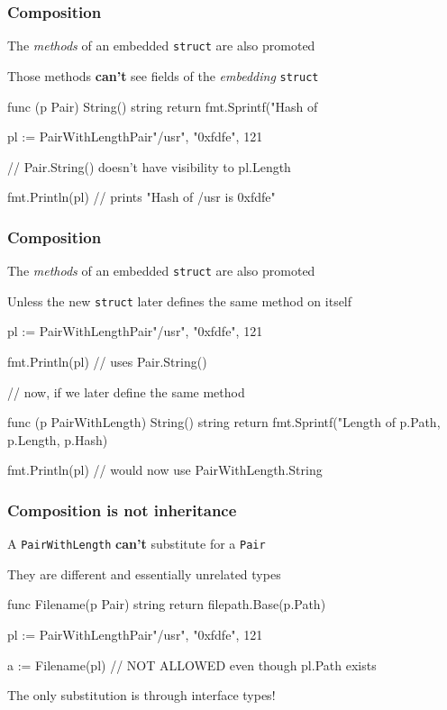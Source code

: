 \documentclass[handout,compress,t,11pt]{beamer}
\begin{document}
\begin{frame}[fragile]
    \frametitle{Composition}
    The {\em methods} of an embedded \verb|struct| are also promoted \par
    \vspace{\baselineskip}
    Those methods {\bf can't} see fields of the {\em embedding} \verb|struct|  \par
    \vspace{\baselineskip}
\begin{golang}
func (p Pair) String() string {
    return fmt.Sprintf("Hash of %
}

pl := PairWithLength{Pair{"/usr", "0xfdfe"}, 121}

// Pair.String() doesn't have visibility to pl.Length

fmt.Println(pl)   // prints "Hash of /usr is 0xfdfe"
\end{golang}
\end{frame}

\begin{frame}[fragile]
    \frametitle{Composition}
    The {\em methods} of an embedded \verb|struct| are also promoted \par
    \vspace{\baselineskip}
    Unless the new \verb|struct| later defines the same method on itself \par
    \vspace{\baselineskip}
\begin{golang}
pl := PairWithLength{Pair{"/usr", "0xfdfe"}, 121}

fmt.Println(pl) // uses Pair.String()

// now, if we later define the same method

func (p PairWithLength) String() string {
    return fmt.Sprintf("Length of %
                       p.Path, p.Length, p.Hash)
}

fmt.Println(pl) // would now use PairWithLength.String
\end{golang}
\end{frame}

\begin{frame}[fragile]
    \frametitle{Composition is not inheritance}
    A \verb|PairWithLength| {\bf can't} substitute for a \verb|Pair| \par
    \vspace{\baselineskip}
    They are different and essentially unrelated types \par
    \vspace{\baselineskip}
\begin{golang}
func Filename(p Pair) string {
    return filepath.Base(p.Path)
}

pl := PairWithLength{Pair{"/usr", "0xfdfe"}, 121}

a := Filename(pl) // NOT ALLOWED even though pl.Path exists
\end{golang}
    \vspace{2\baselineskip}
    The only substitution is through interface types!
\end{frame}
\end{document}
